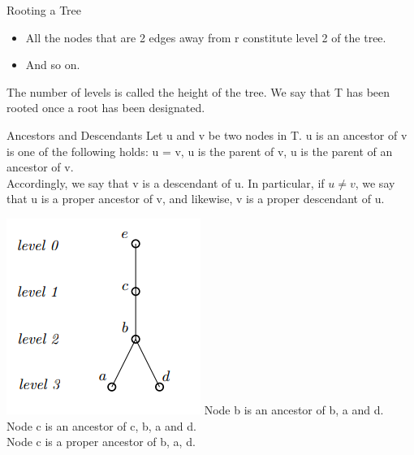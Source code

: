 \documentclass{lecture}
\begin{document}
\begin{landscape}
\begin{multicols}{2}
\begin{note}{Rooting a Tree}
\begin{itemize}[nolistsep]
            \item All the nodes that are 2 edges away from r constitute level 2 of the tree.
            \item And so on.
        \end{itemize}
        The number of levels is called the height of the tree. We say that T has been rooted once a root has been designated.
    \end{note}
    \vfill
    \begin{note}{Ancestors and Descendants}
        Let u and v be two nodes in T. u is an ancestor of v is one of the following holds: u = v, u is the parent of v, u is the parent of an ancestor of v.\\
        Accordingly, we say that v is a descendant of u. In particular, if $u\neq v$, we say that u is a proper ancestor of v, and likewise, v is a proper descendant of u.\\
        \begin{multicols}{2}
        \includegraphics[width=\linewidth]{ancestor}
        Node b is an ancestor of b, a and d.\\
        Node c is an ancestor of c, b, a and d.\\
        Node c is a proper ancestor of b, a, d.
        \end{multicols}
    \end{note}

\end{multicols}
\end{landscape}
\end{document}
